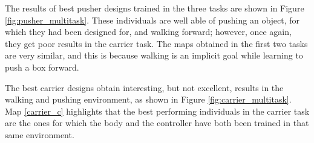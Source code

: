 The results of best pusher designs trained in the three tasks are shown in Figure \ref{fig:pusher_multitask}. These individuals are well able of pushing an object, for which they had been designed for, and walking forward; however, once again, they get poor results in the carrier task. The maps obtained in the first two tasks are very similar, and this is because walking is an implicit goal while learning to push a box forward.

The best carrier designs obtain interesting, but not excellent, results in the walking and pushing environment, as shown in Figure \ref{fig:carrier_multitask}. Map \ref{carrier_c} highlights that the best performing individuals in the carrier task are the ones for which the body and the controller have both been trained in that same environment.

